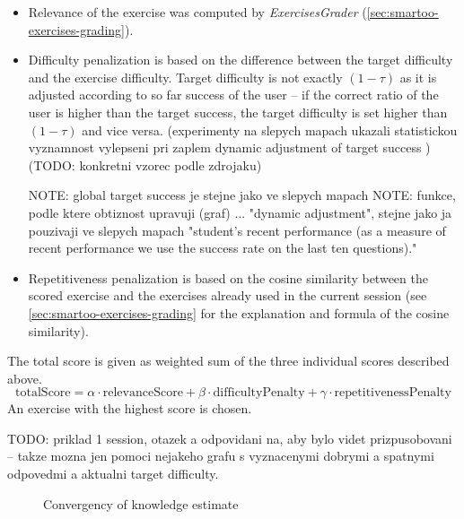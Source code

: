 \documentclass[a4paper, 12pt, twoside]{fithesis2}		%
\renewcommand{\_}{\leavevmode \kern0.07em\vbox{\hrule width0.4em}}
\newcommand{\squarebullet}{\textcolor{black}{\raisebox{0.15em}{\rule{4pt}{4pt}}}}
\newcommand{\emptysquarebullet}{\textcolor{black}{\raisebox{0.10em}{\tiny$\square$}}}
\newenvironment{myItemize}{
  \begin{itemize}[leftmargin=2em,rightmargin=1em,itemsep=\parskip ,parsep=0em,topsep=0em,partopsep=0em]
  \renewcommand{\labelitemi}{\squarebullet}
  \renewcommand{\labelitemii}{\textbullet}
}{
  \end{itemize}
}
\begin{document}
\begin{myItemize}
  \item Relevance of the exercise was computed by \textit{ExercisesGrader}
(\autoref{sec:smartoo-exercises-grading}).

  \item Difficulty penalization is based on the difference between the target difficulty and the exercise difficulty.
Target difficulty is not exactly $(1 - \tau)$ as it is adjusted according to
so far success of the user -- if the correct ratio of the user is higher than the target success,
the target difficulty is set higher than $(1 - \tau)$ and vice versa.
(experimenty na slepych mapach ukazali statistickou vyznamnost vylepseni pri zaplem dynamic adjustment of target success \cite{slepe-mapy-motivation})
(TODO: konkretni vzorec podle zdrojaku)

NOTE: global target success je stejne jako ve slepych mapach \cite{slepe-mapy-motivation}
NOTE: funkce, podle ktere obtiznost upravuji (graf) \cite{slepe-mapy-motivation}
... "dynamic adjustment", stejne jako ja pouzivaji ve slepych mapach "student’s recent performance (as a measure of recent performance we use the success rate on the last ten questions)."

  \item Repetitiveness penalization is based on the cosine similarity between the scored exercise and the exercises already used in the current session
(see \autoref{sec:smartoo-exercises-grading} for the explanation and formula of the cosine similarity).
\end{myItemize}
The total score is given as weighted sum of the three individual scores described above.
$$
\text{totalScore} = \alpha \cdot \text{relevanceScore} + \beta \cdot \text{difficultyPenalty} + \gamma \cdot \text{repetitivenessPenalty}
$$
An exercise with the highest score is chosen.

TODO: priklad 1 session, otazek a odpovidani na, aby bylo videt prizpusobovani -- takze mozna jen pomoci nejakeho grafu s vyznacenymi dobrymi a spatnymi odpovedmi a aktualni target difficulty.

\begin{figure}[h]
  \centering

  \caption{Convergency of knowledge estimate}
  \label{fig:logistic-function}
\end{figure}
\end{document}
